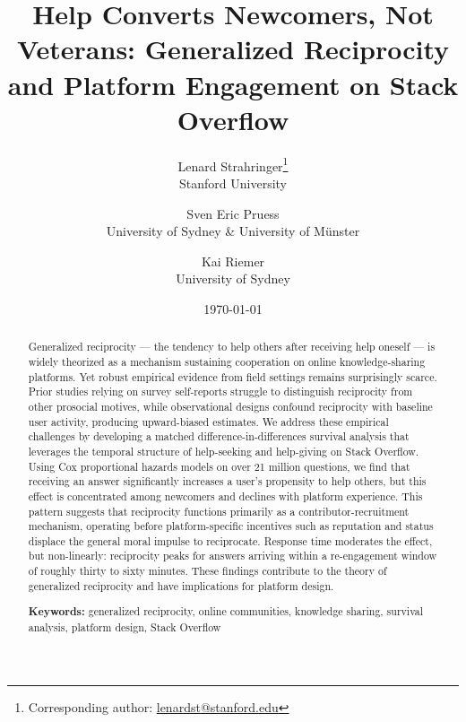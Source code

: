 \documentclass[12pt]{article}
\title{Help Converts Newcomers, Not Veterans: Generalized Reciprocity and Platform Engagement on Stack Overflow}
\author{
  Lenard Strahringer\thanks{Corresponding author: \href{mailto:lenardst@stanford.edu}{lenardst@stanford.edu}} \\
  \small Stanford University
  \and
  Sven Eric Pruess \\
  \small University of Sydney \& University of Münster
  \and
  Kai Riemer \\
  \small University of Sydney
}
\date{\today}
\begin{document}

\maketitle
\thispagestyle{empty}

\begin{abstract}
\noindent Generalized reciprocity — the tendency to help others after receiving help oneself — is widely theorized as a mechanism sustaining cooperation on online knowledge-sharing platforms. Yet robust empirical evidence from field settings remains surprisingly scarce. Prior studies relying on survey self-reports struggle to distinguish reciprocity from other prosocial motives, while observational designs confound reciprocity with baseline user activity, producing upward-biased estimates. We address these empirical challenges by developing a matched difference-in-differences survival analysis that leverages the temporal structure of help-seeking and help-giving on Stack Overflow. Using Cox proportional hazards models on over 21 million questions, we find that receiving an answer significantly increases a user's propensity to help others, but this effect is concentrated among newcomers and declines with platform experience. This pattern suggests that reciprocity functions primarily as a contributor-recruitment mechanism, operating before platform-specific incentives such as reputation and status displace the general moral impulse to reciprocate. Response time moderates the effect, but non-linearly: reciprocity peaks for answers arriving within a re-engagement window of roughly thirty to sixty minutes. These findings contribute to the theory of generalized reciprocity and have implications for platform design.

\bigskip
\noindent\textbf{Keywords:} generalized reciprocity, online communities, knowledge sharing, survival analysis, platform design, Stack Overflow
\end{abstract}

\newpage



\medskip


\newpage
\appendix

\end{document}
